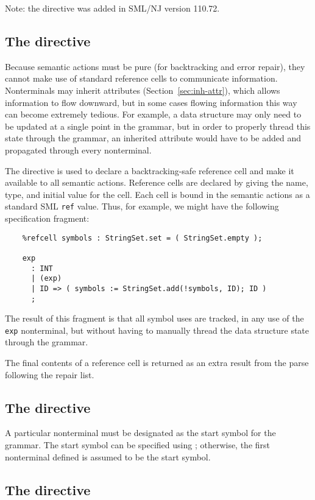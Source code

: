 Note: the  directive was added in SML/NJ version 110.72.

\subsection{The  directive}

Because semantic actions must be pure (for backtracking and error repair), they cannot make use of standard reference cells to communicate information.
Nonterminals may inherit attributes (Section~\ref{sec:inh-attr}), which allows information to flow downward, but in some cases flowing information this way can become extremely tedious.
For example, a data structure may only need to be updated at a single point in the grammar, but in order to properly thread this state through the grammar, an inherited attribute would have to be added and propagated through every nonterminal.

The  directive is used to declare a backtracking-safe reference cell and make it available to all semantic actions.  Reference cells are declared by giving the name, type, and initial value for the cell.  Each cell is bound in the semantic actions as a standard SML \texttt{ref} value.  Thus, for example, we might have the following specification fragment:
\begin{verbatim}
    %refcell symbols : StringSet.set = ( StringSet.empty );
    
    exp
      : INT
      | (exp)
      | ID => ( symbols := StringSet.add(!symbols, ID); ID )
      ;
\end{verbatim}
The result of this fragment is that all symbol uses are tracked, in any use of
the \texttt{exp} nonterminal, but without having to manually thread the data
structure state through the grammar.

The final contents of a reference cell is returned as an extra result from the parse
following the repair list.

\subsection{The  directive}\label{sec:start}

A particular nonterminal must be designated as the start symbol for the grammar.  The start symbol can be specified using ; otherwise, the first nonterminal defined is assumed to be the start symbol.

\subsection{The  directive}

